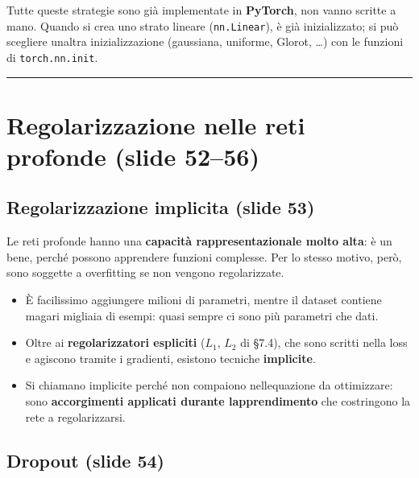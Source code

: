 \documentclass[11pt,a4paper,oneside,openany]{book}
\providecommand{\tightlist}{\setlength{\itemsep}{0pt}\setlength{\parskip}{0pt}}
\begin{document}
Tutte queste strategie sono già implementate in \textbf{PyTorch}, non vanno scritte a mano. Quando si crea uno strato lineare (\texttt{nn.Linear}), è già inizializzato; si può scegliere un\textquotesingle altra inizializzazione (gaussiana, uniforme, Glorot, \ldots) con le funzioni di \texttt{torch.nn.init}.

\begin{center}\rule{0.5\linewidth}{0.5pt}\end{center}

\section{Regolarizzazione nelle reti profonde (slide 52--56)}\label{f01-r969}

\subsection{Regolarizzazione implicita (slide 53)}\label{f01-r971}

Le reti profonde hanno una \textbf{capacità rappresentazionale molto alta}: è un bene, perché possono apprendere funzioni complesse. Per lo stesso motivo, però, sono soggette a overfitting se non vengono regolarizzate.

\begin{itemize}
\tightlist
\item
  È facilissimo aggiungere milioni di parametri, mentre il dataset contiene magari migliaia di esempi: quasi sempre ci sono più parametri che dati.
\item
  Oltre ai \textbf{regolarizzatori espliciti} (\(L_1\), \(L_2\) di §7.4), che sono scritti nella loss e agiscono tramite i gradienti, esistono tecniche \textbf{implicite}.
\item
  Si chiamano implicite perché non compaiono nell\textquotesingle equazione da ottimizzare: sono \textbf{accorgimenti applicati durante l\textquotesingle apprendimento} che costringono la rete a regolarizzarsi.
\end{itemize}

\subsection{Dropout (slide 54)}\label{f01-r979}
\end{document}
